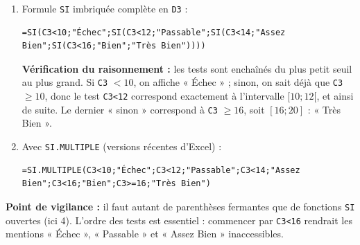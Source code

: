 \documentclass[11pt]{article}
\begin{document}
\begin{corrige}
\begin{enumerate}
    \item Formule \texttt{SI} imbriquée complète en \texttt{D3} :
\begin{lstlisting}
=SI(C3<10;"Échec";SI(C3<12;"Passable";SI(C3<14;"Assez Bien";SI(C3<16;"Bien";"Très Bien"))))
\end{lstlisting}
    \textbf{Vérification du raisonnement :} les tests sont enchaînés du plus petit seuil au plus grand. Si \texttt{C3} $< 10$, on affiche « Échec » ; sinon, on sait déjà que \texttt{C3} $\ge 10$, donc le test \texttt{C3<12} correspond exactement à l'intervalle $[10;12[$, et ainsi de suite. Le dernier « sinon » correspond à \texttt{C3} $\ge 16$, soit $[16;20]$ : « Très Bien ».
    \item Avec \texttt{SI.MULTIPLE} (versions récentes d'Excel) :
\begin{lstlisting}
=SI.MULTIPLE(C3<10;"Échec";C3<12;"Passable";C3<14;"Assez Bien";C3<16;"Bien";C3>=16;"Très Bien")
\end{lstlisting}
\end{enumerate}
\textbf{Point de vigilance :} il faut autant de parenthèses fermantes que de fonctions \texttt{SI} ouvertes (ici 4). L'ordre des tests est essentiel : commencer par \texttt{C3<16} rendrait les mentions « Échec », « Passable » et « Assez Bien » inaccessibles.
\end{corrige}
\end{document}
